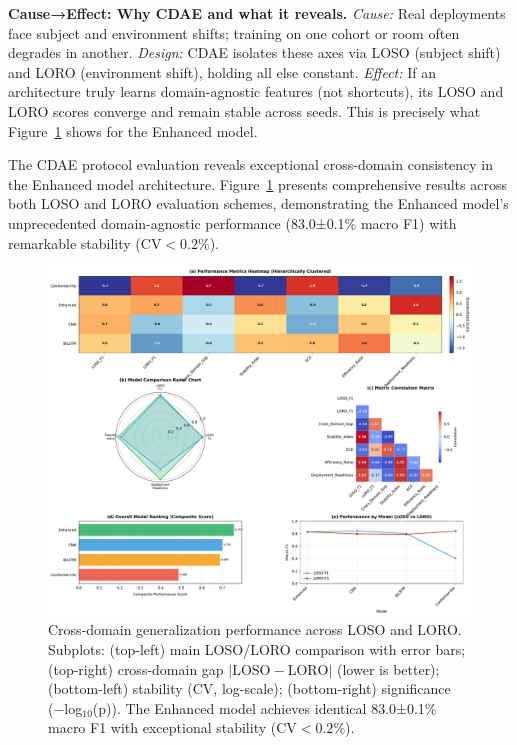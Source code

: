 \documentclass[journal]{IEEEtran}
\begin{document}
\textbf{Cause→Effect: Why CDAE and what it reveals.} \emph{Cause:} Real deployments face subject and environment shifts; training on one cohort or room often degrades in another. \emph{Design:} CDAE isolates these axes via LOSO (subject shift) and LORO (environment shift), holding all else constant. \emph{Effect:} If an architecture truly learns domain-agnostic features (not shortcuts), its LOSO and LORO scores converge and remain stable across seeds. This is precisely what Figure~\ref{fig:cross_domain} shows for the Enhanced model.

The CDAE protocol evaluation reveals exceptional cross-domain consistency in the Enhanced model architecture. Figure~\ref{fig:cross_domain} presents comprehensive results across both LOSO and LORO evaluation schemes, demonstrating the Enhanced model's unprecedented domain-agnostic performance (83.0±0.1\% macro F1) with remarkable stability ($\text{CV}<0.2\%$).

\begin{figure}[ht]
\centering
\includegraphics[width=\columnwidth]{figures/fig5_cross_domain.pdf}%
\caption{Cross-domain generalization performance across LOSO and LORO. Subplots: (top-left) main LOSO/LORO comparison with error bars; (top-right) cross-domain gap $|\text{LOSO}-\text{LORO}|$ (lower is better); (bottom-left) stability (CV, log-scale); (bottom-right) significance (−log$_{10}$(p)). The Enhanced model achieves identical 83.0±0.1\% macro F1 with exceptional stability ($\text{CV}<0.2\%$).}
\label{fig:cross_domain}
\end{figure}
\end{document}
